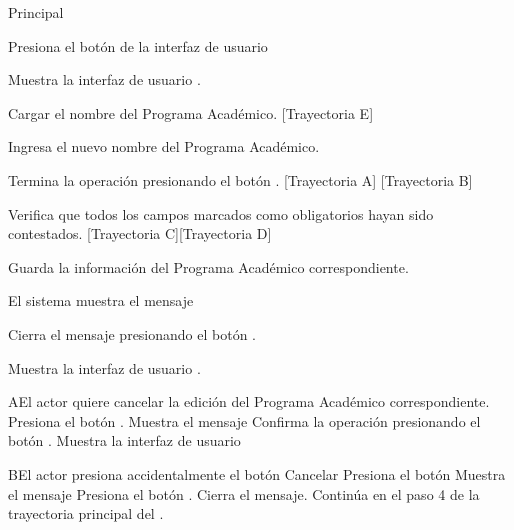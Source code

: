 \begin{UCtrayectoria}{Principal}

    \UCpaso[\UCactor] Presiona el botón  de la interfaz de usuario 

    \UCpaso Muestra la interfaz de usuario .

    \UCpaso Cargar el nombre del Programa Académico. [Trayectoria E]

    \UCpaso[\UCactor] Ingresa el nuevo nombre del Programa Académico.

    \UCpaso[\UCactor] Termina la operación presionando el botón . [Trayectoria A] [Trayectoria B]

    \UCpaso Verifica que todos los campos marcados como obligatorios hayan sido contestados. [Trayectoria C][Trayectoria D]

    \UCpaso Guarda la información del Programa Académico correspondiente.

    \UCpaso El sistema muestra el mensaje 

    \UCpaso[\UCactor] Cierra el mensaje presionando el botón .

    \UCpaso Muestra la interfaz de usuario .
\end{UCtrayectoria}




\begin{UCtrayectoriaA}{A}{El actor quiere cancelar la edición  del Programa Académico correspondiente.}
	\UCpaso[\UCactor] Presiona el botón .
    \UCpaso Muestra el mensaje 
    \UCpaso[\UCactor] Confirma la operación presionando el botón .
    \UCpaso Muestra la interfaz de usuario 
\end{UCtrayectoriaA}



\begin{UCtrayectoriaA}{B}{El actor presiona accidentalmente el botón Cancelar}
	\UCpaso[\UCactor] Presiona el botón 
    \UCpaso Muestra el mensaje
    \UCpaso[\UCactor] Presiona el botón .
    \UCpaso Cierra el mensaje.
    \UCpaso Continúa en el paso 4 de la trayectoria principal del .
\end{UCtrayectoriaA}

